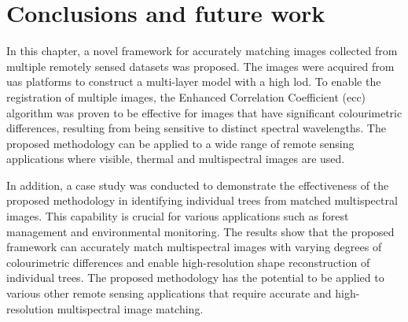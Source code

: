 \section{Conclusions and future work}


In this chapter, a novel framework for accurately matching images collected from multiple remotely sensed datasets was proposed. The images were acquired from \acrshort{uas} platforms to construct a multi-layer model with a high \acrshort{lod}. To enable the registration of multiple images, the Enhanced Correlation Coefficient (\acrshort{ecc}) algorithm was proven to be effective for images that have significant colourimetric differences, resulting from being sensitive to distinct spectral wavelengths. The proposed methodology can be applied to a wide range of remote sensing applications where visible, thermal and multispectral images are used.

In addition, a case study was conducted to demonstrate the effectiveness of the proposed methodology in identifying individual trees from matched multispectral images. This capability is crucial for various applications such as forest management and environmental monitoring. The results show that the proposed framework can accurately match multispectral images with varying degrees of colourimetric differences and enable high-resolution shape reconstruction of individual trees. The proposed methodology has the potential to be applied to various other remote sensing applications that require accurate and high-resolution multispectral image matching.


